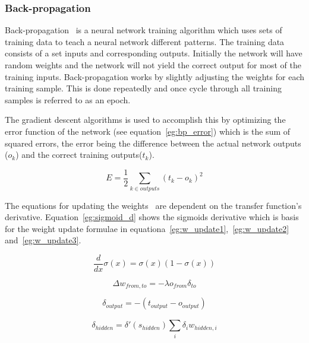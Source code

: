 \subsubsection{Back-propagation}

Back-propagation~\cite{koehn1994combining} is a neural network training algorithm which uses sets of training data to teach a neural network different patterns. The training data consists of a set inputs and corresponding outputs. Initially the network will have random weights and the network will not yield the correct output for most of the training inputs. Back-propagation works by slightly adjusting the weights for each training sample. This is done repeatedly and once cycle through all training samples is referred to as an epoch.

The gradient descent algorithms is used to accomplish this by optimizing the error function of the network (see equation~\ref{eg:bp_error}) which is the sum of squared errors, the error being the difference between the actual network outputs ($o_k$) and the correct training outputs($t_k$).

\begin{equation} \label{eg:bp_error}
  E=\frac{1}{2}\sum_{k\in outputs}^{}{(t_k-o_k)^2}
\end{equation}

The equations for updating the weights~\cite{koehn1994combining} are dependent on the transfer function's derivative. Equation~\ref{eg:sigmoid_d} shows the sigmoids derivative which is basis for the weight update formulae in equationa~\ref{eg:w_update1},~\ref{eg:w_update2} and~\ref{eg:w_update3}.

\begin{equation} \label{eg:sigmoid_d}
  \frac{d}{dx}\sigma(x)=\sigma(x)(1-\sigma(x))
\end{equation}

\begin{equation} \label{eg:w_update1}
  \Delta w_{from,to} = -\lambda o_{from}\delta_{to}
\end{equation}

\begin{equation} \label{eg:w_update2}
  \delta_{output} = -(t_{output}-o_{output})
\end{equation}

\begin{equation} \label{eg:w_update3}
  \delta_{hidden} = \delta'(s_{hidden})\sum_{i}^{}{\delta_{i}w_{hidden,i}}
\end{equation}
